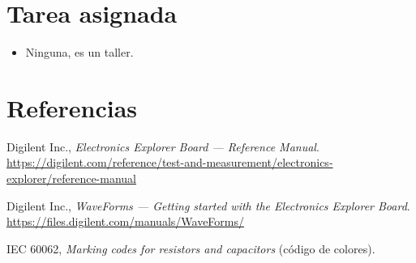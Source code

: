 \documentclass[11pt,a4paper]{article}
\begin{document}
\FloatBarrier
\section{Tarea asignada}
\begin{itemize}
    \item Ninguna, es un taller.
\end{itemize}

\section*{Referencias}
\begin{enumerate}[label={[\arabic*]}]
    \item Digilent Inc., \emph{Electronics Explorer Board --- Reference Manual}.
          \url{https://digilent.com/reference/test-and-measurement/electronics-explorer/reference-manual}
    \item Digilent Inc., \emph{WaveForms --- Getting started with the Electronics Explorer Board}.
          \url{https://files.digilent.com/manuals/WaveForms/}
    \item IEC 60062, \emph{Marking codes for resistors and capacitors} (código de colores).
\end{enumerate}
\end{document}
